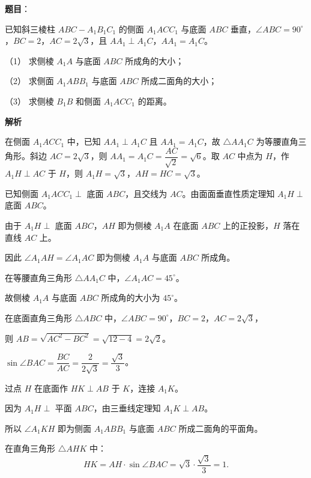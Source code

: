 \begin{answer}

\textbf{题目}：

已知斜三棱柱 $ABC-A_1B_1C_1$ 的侧面 $A_1ACC_1$ 与底面 $ABC$ 垂直，$\angle ABC=90^\circ$，$BC=2$，$AC=2\sqrt3$，且 $AA_1\perp A_1C$，$AA_1=A_1C$。

（1） 求侧棱 $A_1A$ 与底面 $ABC$ 所成角的大小；

（2） 求侧面 $A_1ABB_1$ 与底面 $ABC$ 所成二面角的大小；

（3） 求侧棱 $B_1B$ 和侧面 $A_1ACC_1$ 的距离。
\nopagebreak[4]
\begin{center}\end{center}
\nopagebreak[4]
\textbf{解析}

在侧面 $A_1ACC_1$ 中，已知 $AA_1 \perp A_1C$ 且 $AA_1 = A_1C$，故 $\triangle AA_1C$ 为等腰直角三角形。斜边 $AC = 2\sqrt3$，则 $AA_1 = A_1C = \dfrac{AC}{\sqrt2} = \sqrt6$。取 $AC$ 中点为 $H$，作 $A_1H \perp AC$ 于 $H$，则 $A_1H = \sqrt3$，$AH = HC = \sqrt3$。

已知侧面 $A_1ACC_1 \perp$ 底面 $ABC$，且交线为 $AC$。由面面垂直性质定理知 $A_1H \perp$ 底面 $ABC$。


由于 $A_1H \perp$ 底面 $ABC$，$AH$ 即为侧棱 $A_1A$ 在底面 $ABC$ 上的正投影，$H$ 落在直线 $AC$ 上。

因此 $\angle A_1AH = \angle A_1AC$ 即为侧棱 $A_1A$ 与底面 $ABC$ 所成角。

在等腰直角三角形 $\triangle AA_1C$ 中，$\angle A_1AC = 45^\circ$。

故侧棱 $A_1A$ 与底面 $ABC$ 所成角的大小为 $45^\circ$。


在底面直角三角形 $\triangle ABC$ 中，$\angle ABC = 90^\circ$，$BC = 2$，$AC = 2\sqrt3$，

则 $AB = \sqrt{AC^2 - BC^2} = \sqrt{12 - 4} = 2\sqrt2$。

$\sin\angle BAC = \dfrac{BC}{AC} = \dfrac{2}{2\sqrt3} = \dfrac{\sqrt3}{3}$。

过点 $H$ 在底面作 $HK \perp AB$ 于 $K$，连接 $A_1K$。

因为 $A_1H \perp$ 平面 $ABC$，由三垂线定理知 $A_1K \perp AB$。

所以 $\angle A_1KH$ 即为侧面 $A_1ABB_1$ 与底面 $ABC$ 所成二面角的平面角。

在直角三角形 $\triangle AHK$ 中：
\nopagebreak[4]
\[
HK = AH \cdot \sin\angle BAC = \sqrt3 \cdot \frac{\sqrt3}{3} = 1.
\]


\end{answer}
